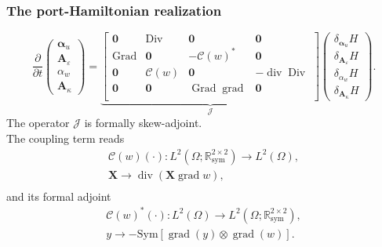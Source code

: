 \documentclass[aspectratio=169]{beamer}
\DeclareMathOperator*{\grad}{grad}
\DeclareMathOperator*{\Grad}{Grad}
\DeclareMathOperator*{\Div}{Div}
\renewcommand{\div}{\operatorname{div}}
\newcommand{\bbR}{\mathbb{R}}
\begin{document}
\begin{frame}[fragile]\frametitle{The port-Hamiltonian realization}
	
	\begin{equation*}
	\frac{\partial}{\partial t}
	\begin{pmatrix}
		\bm{\alpha}_u \\
		\bm{A}_\varepsilon \\
		\alpha_w \\
		\bm{A}_\kappa
	\end{pmatrix} = 
	\underbrace{\begin{bmatrix}
			\bm{0} & \Div & \bm{0} & \bm{0} \\
			\Grad & \bm{0} & -\mathcal{C}(w)^* & \bm{0} \\
			\bm{0} & \mathcal{C}(w) &  \bm{0} & -\div\Div \\
			\bm{0} & \bm{0} & \Grad\grad & \bm{0} \\ 
	\end{bmatrix}}_{\mathcal{J}}  
	\begin{pmatrix}
		\delta_{\bm\alpha_u} H \\
		\delta_{\bm{A}_\varepsilon} H \\
		\delta_{\alpha_w} H \\
		\delta_{\bm{A}_\kappa} H
	\end{pmatrix}.
\end{equation*}
The operator $\mathcal{J}$ is formally skew-adjoint. \\
The coupling term reads
\begin{equation*}
	\begin{aligned}
		\mathcal{C}(w)(\cdot): L^2(\Omega; \bbR^{2\times 2}_{\text{sym}}) \rightarrow L^2(\Omega), \\
								\bm{X}  \rightarrow \div( \bm{X} \grad w), \\
	\end{aligned} 
\end{equation*}
and its formal adjoint
\begin{equation*}
	\begin{aligned}
		\mathcal{C}(w)^*(\cdot): L^2(\Omega) \rightarrow L^2(\Omega; \bbR^{2\times 2}_{\text{sym}}), \\
		y  \rightarrow  -\mathrm{Sym}\left[\grad (y) \otimes \grad(w)\right].
	\end{aligned}
\end{equation*}


\end{frame}
\end{document}
